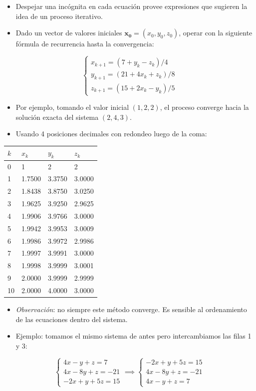 \documentclass[openany]{book}
\providecommand{\tightlist}{%
  \setlength{\itemsep}{0pt}\setlength{\parskip}{0pt}}
\begin{document}
\begin{itemize}
\tightlist
\item
  Despejar una incógnita en cada ecuación provee expresiones que sugieren la idea de un proceso iterativo.
\item
  Dado un vector de valores iniciales \(\mathbf{x_0}=(x_0, y_0, z_0)\), operar con la siguiente fórmula de recurrencia hasta la convergencia:
\end{itemize}

\[
\begin{cases} 
x_{k+1}=(7+y_k-z_k)/4 \\
y_{k+1}=(21+4x_k+z_k)/8 \\
z_{k+1}=(15+2x_k-y_k)/5
\end{cases}
\]

\begin{itemize}
\tightlist
\item
  Por ejemplo, tomando el valor inicial \((1, 2, 2)\), el proceso converge hacia la solución exacta del sistema \((2, 4, 3)\).
\item
  Usando 4 posiciones decimales con redondeo luego de la coma:
\end{itemize}

\begin{longtable}[]{@{}llll@{}}
\toprule
\(k\) & \(x_k\) & \(y_k\) & \(z_k\)\tabularnewline
\midrule
\endhead
0 & 1 & 2 & 2\tabularnewline
1 & 1.7500 & 3.3750 & 3.0000\tabularnewline
2 & 1.8438 & 3.8750 & 3.0250\tabularnewline
3 & 1.9625 & 3.9250 & 2.9625\tabularnewline
4 & 1.9906 & 3.9766 & 3.0000\tabularnewline
5 & 1.9942 & 3.9953 & 3.0009\tabularnewline
6 & 1.9986 & 3.9972 & 2.9986\tabularnewline
7 & 1.9997 & 3.9991 & 3.0000\tabularnewline
8 & 1.9998 & 3.9999 & 3.0001\tabularnewline
9 & 2.0000 & 3.9999 & 2.9999\tabularnewline
10 & 2.0000 & 4.0000 & 3.0000\tabularnewline
\bottomrule
\end{longtable}

\begin{itemize}
\tightlist
\item
  \emph{Observación}: no siempre este método converge. Es sensible al ordenamiento de las ecuaciones dentro del sistema.
\item
  Ejemplo: tomamos el mismo sistema de antes pero intercambiamos las filas 1 y 3:
\end{itemize}

\[
\begin{cases} 
4x-y+z=7 \\
4x-8y+z=-21 \\
-2x+y+5z=15
\end{cases}
\implies
\begin{cases} 
-2x+y+5z=15 \\
4x-8y+z=-21 \\
4x-y+z=7
\end{cases}
\]
\end{document}
